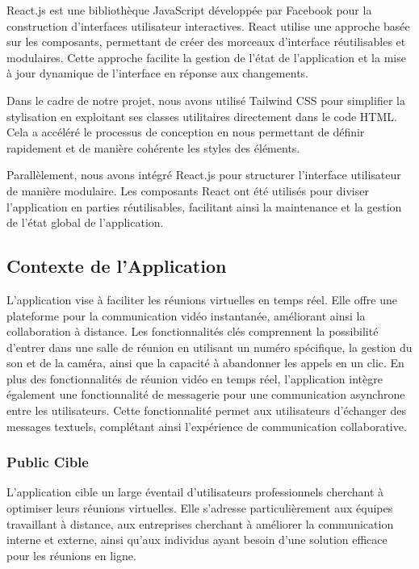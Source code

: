 \documentclass[12pt, a4paper, oneside]{article}
\begin{document}
React.js est une bibliothèque JavaScript développée par Facebook pour la construction d'interfaces utilisateur interactives. React utilise une approche basée sur les composants, permettant de créer des morceaux d'interface réutilisables et modulaires. Cette approche facilite la gestion de l'état de l'application et la mise à jour dynamique de l'interface en réponse aux changements.

Dans le cadre de notre projet, nous avons utilisé Tailwind CSS pour simplifier la stylisation en exploitant ses classes utilitaires directement dans le code HTML. Cela a accéléré le processus de conception en nous permettant de définir rapidement et de manière cohérente les styles des éléments.

Parallèlement, nous avons intégré React.js pour structurer l'interface utilisateur de manière modulaire. Les composants React ont été utilisés pour diviser l'application en parties réutilisables, facilitant ainsi la maintenance et la gestion de l'état global de l'application.

\subsection{Contexte de l'Application}
L'application vise à faciliter les réunions virtuelles en temps réel. Elle offre une plateforme pour la communication vidéo instantanée, améliorant ainsi la collaboration à distance. Les fonctionnalités clés comprennent la possibilité d'entrer dans une salle de réunion en utilisant un numéro spécifique, la gestion du son et de la caméra, ainsi que la capacité à abandonner les appels en un clic.
En plus des fonctionnalités de réunion vidéo en temps réel, l'application intègre également une fonctionnalité de messagerie pour une communication asynchrone entre les utilisateurs. Cette fonctionnalité permet aux utilisateurs d'échanger des messages textuels, complétant ainsi l'expérience de communication collaborative.

\subsubsection{Public Cible}
L'application cible un large éventail d'utilisateurs professionnels cherchant à optimiser leurs réunions virtuelles. Elle s'adresse particulièrement aux équipes travaillant à distance, aux entreprises cherchant à améliorer la communication interne et externe, ainsi qu'aux individus ayant besoin d'une solution efficace pour les réunions en ligne.
\end{document}
